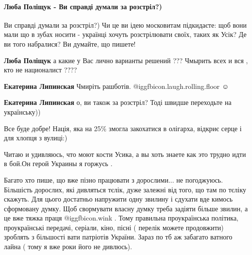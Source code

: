  
 
 
 
 
\paragraph{Люба Поліщук - Ви справді думали за розстріл?)}

\begin{itemize} %
Ви справді думали за розстріл?)
Чи це ви ідею московитам підкидаєте: щоб вони мали що в зубах носити - українці хочуть розстрілювати своїх, таких як Усік?
Де ви того набралися? Ви думайте, що пишете!

\begin{itemize} %
\textbf{Люба Поліщук} а какие у Вас лично варианты решений ??? Чмырить всех и вся , кто не националист ????

\textbf{Екатерина Липинская}
Чмиріть рашботів. @igg{fbicon.laugh.rolling.floor} ☺

\textbf{Екатерина Липинская} о, ви також за розстріл?
Тоді швидше переходьте на українську))
\end{itemize} %

Все буде добре!
Нація, яка на 25\% змогла закохатися в олігарха, відкриє серце і для хлопця з вулиці:)

Читаю и удивляюсь, что моют кости Усика, а вы хоть знаете как это трудно идти в бой.Он герой Украины я горжусь .


Багато хто пише, що вже пізно працювати з дорослими... не погоджуюсь. Більшість
дорослих, які дивляться тєлік, дуже залежні від того, що там по тєліку скажуть.
Для цього достатньо напружити одну звилину і сдухати вде кимось сформовану
думку. Щоб свормувати власну думку треба задіяти більше звилин, а це вже тяжка
праця  @igg{fbicon.wink} . Тому правильна проукраїнська політика, проукраїнські передачі,
серіали, кіно, пісні ( перелік можете продовжити) зроблять з більшості вати
патріотів України. Зараз по тб аж забагато ватного лайна ( тому я вже роки його
не дивлюсь).


\end{itemize}
